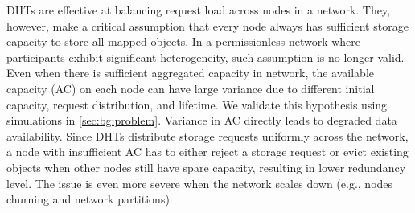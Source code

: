 %


DHTs are effective at balancing request load across nodes in a network.
They, however, make a critical assumption that every node always has sufficient storage capacity to store all mapped objects.
In a permissionless network where participants exhibit significant heterogeneity, such assumption is no longer valid.
Even when there is sufficient aggregated capacity in network, the available capacity (AC) on each node can have large variance due to different initial capacity, request distribution, and lifetime.
We validate this hypothesis using simulations in \autoref{sec:bg:problem}.
Variance in AC directly leads to degraded data availability.
Since DHTs distribute storage requests uniformly across the network, a node with insufficient AC has to either reject a storage request or evict existing objects when other nodes still have spare capacity, resulting in lower redundancy level.
The issue is even more severe when the network scales down (e.g., nodes churning and network partitions).

